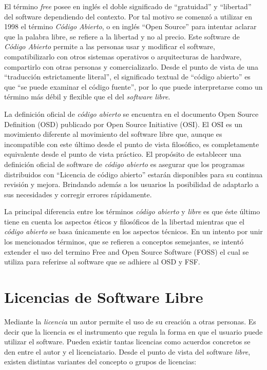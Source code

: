 El término \textit{free} posee en inglés el doble significado
de ``gratuidad'' y ``libertad'' del software dependiendo del
contexto. Por tal motivo se comenzó a utilizar
en 1998 el término \textit{Código Abierto}, o en inglés ``Open
Source'' para intentar aclarar que la palabra libre, se refiere a la libertad y no al precio. Este software de \textit{Código Abierto} permite a las personas usar y modificar el software, compatibilizarlo con otros sistemas operativos o arquitecturas de hardware, compartirlo con otras personas y comercializarlo.
Desde el punto de vista de una ``traducción
estrictamente literal'', el significado textual de ``código abierto''
es que ``se puede examinar el código fuente'', por lo que puede
interpretarse como un término más débil y flexible que el del
\textit{software libre}. 

La definición oficial de \textit{código abierto} se encuentra en el
documento Open Source Definition (OSD) publicado por Open
Source Initiative (OSI). El OSI es un movimiento diferente al
movimiento del software libre que, aunque es incompatible con este
último desde el punto de vista filosófico, es completamente
equivalente desde el punto de vista práctico. El propósito de
establecer una definición oficial de software de \textit{código
  abierto} es asegurar que los programas distribuidos con ``Licencia
de código abierto'' estarán disponibles para su continua revisión y
mejora. Brindando además a los usuarios la posibilidad de adaptarlo a
sus necesidades y corregir errores rápidamente.

La principal diferencia entre los términos \textit{código abierto} y
\textit{libre} es que éste último tiene en cuenta los aspectos éticos
y filosóficos de la libertad mientras que el \textit{código abierto}
se basa únicamente en los aspectos técnicos. En un intento por unir
los mencionados términos, que se refieren a conceptos semejantes, se
intentó extender el uso del termino Free and Open Source Software
(FOSS) el cual se utiliza para referirse al software que se adhiere al
OSD y FSF.


\section{Licencias de Software Libre}

Mediante la \textit{licencia} un autor permite el uso de su creación a
otras personas. Es decir que la licencia es el instrumento que regula
la forma en que el usuario puede utilizar el software. Pueden existir
tantas licencias como acuerdos concretos se den entre el autor y el
licenciatario. Desde el punto de vista del software \textit{libre},
existen distintas variantes del concepto o grupos de licencias:

